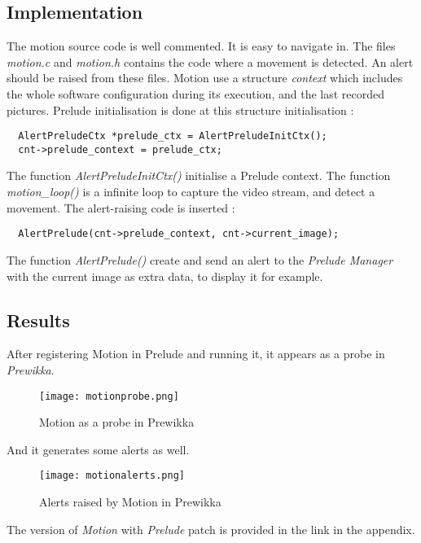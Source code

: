 \documentclass{koala-en}
\begin{document}
\subsection{Implementation}
The motion source code is well commented. It is easy to navigate in.
\newline
\newline
The files \emph{motion.c} and \emph{motion.h} contains the code where a movement is detected. An alert should be raised from these files.
\newline
\newline
Motion use a structure \emph{context} which includes the whole software configuration during its execution, and the last recorded pictures.
Prelude initialisation is done at this structure initialisation :
\begin{lstlisting}
  AlertPreludeCtx *prelude_ctx = AlertPreludeInitCtx();
  cnt->prelude_context = prelude_ctx;
\end{lstlisting}
The function \emph{AlertPreludeInitCtx()} initialise a Prelude context.
\newline
\newline
The function \emph{motion\_loop()} is a infinite loop to capture the video stream, and detect a movement. The alert-raising code is inserted :
\begin{lstlisting}
  AlertPrelude(cnt->prelude_context, cnt->current_image);
\end{lstlisting}
The function \emph{AlertPrelude()} create and send an alert to the \emph{Prelude Manager} with the current image as extra data, to display it for example.

\subsection{Results}
After registering Motion in Prelude and running it, it appears as a probe in \emph{Prewikka}.
\begin{figure}[!ht]
  \center
  \texttt{[image: motionprobe.png]}
  \caption{Motion as a probe in Prewikka}
\end{figure}

And it generates some alerts as well.
\begin{figure}[!ht]
  \center
  \texttt{[image: motionalerts.png]}
  \caption{Alerts raised by Motion in Prewikka}
\end{figure}

The version of \emph{Motion} with \emph{Prelude} patch is provided in the link in the appendix.
\end{document}
